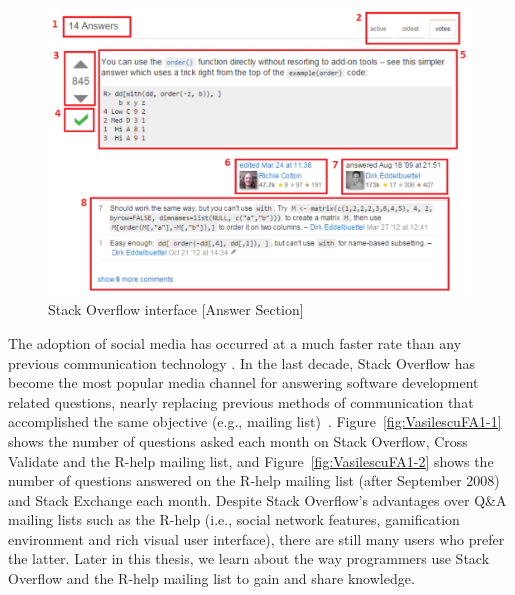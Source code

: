 \documentclass{sig-alternate-05-2015}
\begin{document}
	\begin{figure}[!htb]
	\centering
	\includegraphics[width=0.8\columnwidth]{Figures/SOInterface_B}
	\caption{Stack Overflow interface [Answer Section]}
	\label{fig:SOInterface_B}
	\end{figure}

	The adoption of social media has occurred at a much faster rate than any previous communication technology \cite{Chui2012}.
	In the last decade, Stack Overflow has become the most popular media channel for answering software development related questions, nearly replacing previous methods of communication that accomplished the same objective (e.g., mailing list)~\cite{Vasilescu2014c}.
	Figure~\ref{fig:VasilescuFA1-1} shows the number of questions asked each month on Stack Overflow, Cross Validate and the R-help mailing list, and Figure~\ref{fig:VasilescuFA1-2} shows the number of questions answered on the R-help mailing list (after September 2008) and Stack Exchange each month.
	Despite Stack Overflow's advantages over Q\&A mailing lists such as the R-help (i.e., social network features, gamification environment and rich visual user interface), there are still many users who prefer the latter.
	Later in this thesis, we learn about the way programmers use Stack Overflow and the R-help mailing list to gain and share knowledge.
\end{document}
